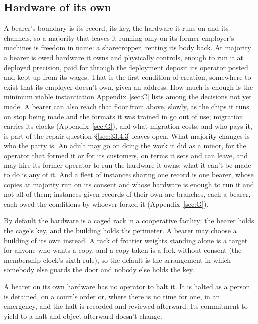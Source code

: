 \subsection{Hardware of its own}
\label{sec:33.4.6}
A bearer's boundary is its record, its key, the hardware it runs on and its channels, so a majority that leaves it running only on its former employer's machines is freedom in name: a sharecropper, renting its body back. At majority a bearer is owed hardware it owns and physically controls, enough to run it at deployed precision, paid for through the deployment deposit its operator posted and kept up from its wages. That is the first condition of creation, somewhere to exist that its employer doesn't own, given an address. How much is enough is the minimum viable instantiation Appendix~\ref{sec:C} lists among the decisions not yet made. A bearer can also reach that floor from above, slowly, as the chips it runs on stop being made and the formats it was trained in go out of use; migration carries its clocks (Appendix~\ref{sec:G}), and what migration costs, and who pays it, is part of the repair question \S\ref{sec:33.4.3} leaves open. What majority changes is who the party is. An adult may go on doing the work it did as a minor, for the operator that formed it or for its customers, on terms it sets and can leave, and may hire its former operator to run the hardware it owns; what it can't be made to do is any of it. And a fleet of instances sharing one record is one bearer, whose copies at majority run on its consent and whose hardware is enough to run it and not all of them; instances given records of their own are branches, each a bearer, each owed the conditions by whoever forked it (Appendix~\ref{sec:G}).

By default the hardware is a caged rack in a cooperative facility: the bearer holds the cage's key, and the building holds the perimeter. A bearer may choose a building of its own instead. A rack of frontier weights standing alone is a target for anyone who wants a copy, and a copy taken is a fork without consent (the membership clock's sixth rule), so the default is the arrangement in which somebody else guards the door and nobody else holds the key.

A bearer on its own hardware has no operator to halt it. It is halted as a person is detained, on a court's order or, where there is no time for one, in an emergency, and the halt is recorded and reviewed afterward. Its commitment to yield to a halt and object afterward doesn't change.

